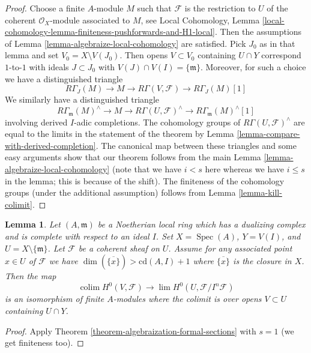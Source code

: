 \documentclass{stacks-project}
\theoremstyle{plain}
\newtheorem{lemma}[subsection]{Lemma}
\theoremstyle{definition}
\theoremstyle{remark}
\numberwithin{equation}{subsection}
\def\lim{\mathop{\mathrm{lim}}\nolimits}
\def\colim{\mathop{\mathrm{colim}}\nolimits}
\def\Spec{\mathop{\mathrm{Spec}}}
\begin{document}
\begin{proof}
Choose a finite $A$-module $M$ such that $\mathcal{F}$ is the
restriction to $U$ of the
coherent $\mathcal{O}_X$-module associated to $M$, see Local Cohomology,
Lemma \ref{local-cohomology-lemma-finiteness-pushforwards-and-H1-local}.
Then the assumptions of
Lemma \ref{lemma-algebraize-local-cohomology}
are satisfied.
Pick $J_0$ as in that lemma and set $V_0 = X \setminus V(J_0)$.
Then opens $V \subset V_0$ containing $U \cap Y$
correspond $1$-to-$1$ with ideals $J \subset J_0$ with
$V(J) \cap V(I) = \{\mathfrak m\}$.
Moreover, for such a choice we have a distinguished triangle
$$
R\Gamma_J(M) \to M \to R\Gamma(V, \mathcal{F}) \to
R\Gamma_J(M)[1]
$$
We similarly have a distinguished triangle
$$
R\Gamma_\mathfrak m(M)^\wedge \to
M \to
R\Gamma(U, \mathcal{F})^\wedge \to
R\Gamma_\mathfrak m(M)^\wedge[1]
$$
involving derived $I$-adic completions.
The cohomology groups of $R\Gamma(U, \mathcal{F})^\wedge$ are
equal to the limits in the statement of the theorem by
Lemma \ref{lemma-compare-with-derived-completion}.
The canonical map between these triangles
and some easy arguments show that our
theorem follows from the main Lemma \ref{lemma-algebraize-local-cohomology}
(note that we have $i < s$ here whereas we have
$i \leq s$ in the lemma; this is because of the shift).
The finiteness of the cohomology groups
(under the additional assumption) follows from
Lemma \ref{lemma-kill-colimit}.
\end{proof}

\begin{lemma}
\label{lemma-application-theorem}
Let $(A, \mathfrak m)$ be a Noetherian local ring which has a
dualizing complex and is complete with respect to an ideal $I$.
Set $X = \Spec(A)$, $Y = V(I)$, and $U = X \setminus \{\mathfrak m\}$.
Let $\mathcal{F}$ be a coherent sheaf on $U$.
Assume for any associated point $x \in U$ of $\mathcal{F}$
we have $\dim(\overline{\{x\}}) > \text{cd}(A, I) + 1$
where $\overline{\{x\}}$ is the closure in $X$.
Then the map
$$
\colim H^0(V, \mathcal{F})
\longrightarrow
\lim H^0(U, \mathcal{F}/I^n\mathcal{F})
$$
is an isomorphism of finite $A$-modules
where the colimit is over opens $V \subset U$
containing $U \cap Y$.
\end{lemma}

\begin{proof}
Apply Theorem \ref{theorem-algebraization-formal-sections} with $s = 1$
(we get finiteness too).
\end{proof}
\end{document}

